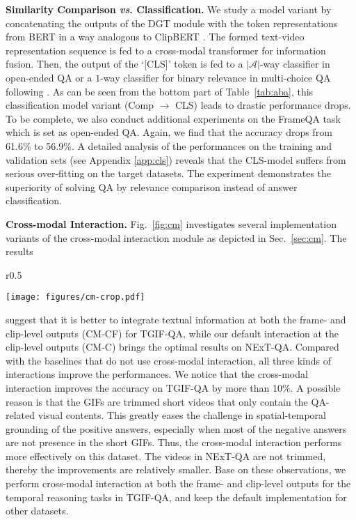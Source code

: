 \documentclass[runningheads]{llncs}
\newcommand{\vs}{\textit{vs}. }
\begin{document}
\textbf{Similarity Comparison \vs Classification.}
We study a model variant by concatenating the outputs of the DGT module with the token representations from BERT in a way analogous to ClipBERT \cite{lei2021less}. The formed text-video representation sequence is fed to a cross-modal transformer for information fusion. Then, the output of the `[CLS]' token is fed to a $|\mathcal{A}|$-way classifier in open-ended QA or a $1$-way classifier for binary relevance in multi-choice QA following \cite{jang2017tgif,le2020hierarchical,xiao2021video}. As can be seen from the bottom part of Table~\ref{tab:aba}, this classification model variant (Comp $\rightarrow$ CLS) leads to drastic performance drops. To be complete, we also conduct additional experiments on the FrameQA task which is set as open-ended QA. Again, we find that the accuracy drops from 61.6\% to 56.9\%. A detailed analysis of the performances on the training and validation sets (see Appendix \ref{app:cls}) reveals that the CLS-model suffers from serious over-fitting on the target datasets. The experiment demonstrates the superiority of solving QA by relevance comparison instead of answer classification.

\textbf{Cross-modal Interaction.}
Fig.~\ref{fig:cm} investigates several implementation variants of the cross-modal interaction module as depicted in Sec.~\ref{sec:cm}. The results
\begin{wrapfigure}[8]{r}{0.5\textwidth}
 \vspace{-32pt}
  \begin{center}
    \texttt{[image: figures/cm-crop.pdf]}
  \end{center}
   \vspace{-23pt}
  \caption{Study of Cross-modal Interaction.}
  \label{fig:cm}
\end{wrapfigure}
suggest that it is better to integrate textual information at both the frame- and clip-level outputs (CM-CF) for TGIF-QA, while our default interaction at the clip-level outputs (CM-C) brings the optimal results on NExT-QA. 
Compared with the baselines that do not use cross-modal interaction, all three kinds of interactions improve the performances. We notice that the cross-modal interaction improves the accuracy on TGIF-QA by more than 10\%. A possible reason is that the GIFs are trimmed short videos that only contain the QA-related visual contents. This greatly eases the challenge in spatial-temporal grounding of the positive answers, especially when most of the negative answers are not presence in the short GIFs. Thus, the cross-modal interaction performs more effectively on this dataset. The videos in NExT-QA are not trimmed, thereby the improvements are relatively smaller.
Base on these observations, we perform cross-modal interaction at both the frame- and clip-level outputs for the temporal reasoning tasks in TGIF-QA, and keep the default implementation for other datasets.
\end{document}
